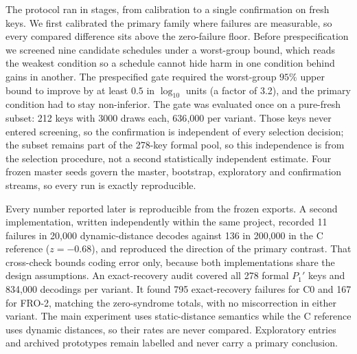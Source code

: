 The protocol ran in stages, from calibration to a single confirmation on fresh keys. We first calibrated the primary family where failures are measurable, so every compared difference sits above the zero-failure floor. Before prespecification we screened nine candidate schedules under a worst-group bound, which reads the weakest condition so a schedule cannot hide harm in one condition behind gains in another. The prespecified gate required the worst-group $95\%$ upper bound to improve by at least $0.5$ in $\log_{10}$ units (a factor of 3.2), and the primary condition had to stay non-inferior. The gate was evaluated once on a pure-fresh subset: 212 keys with 3000 draws each, 636{,}000 per variant. Those keys never entered screening, so the confirmation is independent of every selection decision; the subset remains part of the 278-key formal pool, so this independence is from the selection procedure, not a second statistically independent estimate. Four frozen master seeds govern the master, bootstrap, exploratory and confirmation streams, so every run is exactly reproducible.

Every number reported later is reproducible from the frozen exports. A second implementation, written independently within the same project, recorded 11 failures in 20{,}000 dynamic-distance decodes against 136 in 200{,}000 in the C reference ($z=-0.68$), and reproduced the direction of the primary contrast. That cross-check bounds coding error only, because both implementations share the design assumptions. An exact-recovery audit covered all 278 formal $P_1'$ keys and 834{,}000 decodings per variant. It found 795 exact-recovery failures for C0 and 167 for FRO-2, matching the zero-syndrome totals, with no miscorrection in either variant. The main experiment uses static-distance semantics while the C reference uses dynamic distances, so their rates are never compared. Exploratory entries and archived prototypes remain labelled and never carry a primary conclusion.

